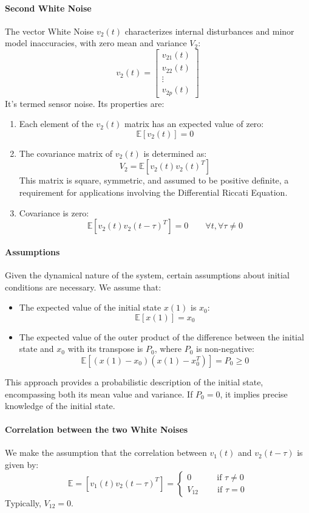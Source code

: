 \paragraph*{Second White Noise}
The vector White Noise $v_2(t)$ characterizes internal disturbances and minor model inaccuracies, with zero mean and variance $V_2$:
\[v_2(t)=\begin{bmatrix} v_{21}(t) \\ v_{22}(t) \\ \vdots \\ v_{2p}(t) \end{bmatrix}\]
It's termed sensor noise. 
Its properties are:
\begin{enumerate}
    \item Each element of the $v_2(t)$ matrix has an expected value of zero:
        \[\mathbb{E}\left[v_2(t)\right]=0\]
    \item The covariance matrix of $v_2(t)$ is determined as:
        \[V_2=\mathbb{E}\left[v_2(t)v_2(t)^T\right]\]
        This matrix is square, symmetric, and assumed to be positive definite, a requirement for applications involving the Differential Riccati Equation.
    \item Covariance is zero:
        \[\mathbb{E}\left[v_2(t)v_2(t-\tau)^T\right]=0\qquad \forall t, \forall\tau\neq 0\]
\end{enumerate}

\paragraph*{Assumptions}
Given the dynamical nature of the system, certain assumptions about initial conditions are necessary. 
We assume that:
\begin{itemize}
    \item The expected value of the initial state $x(1)$ is $x_0$: 
        \[\mathbb{E}\left[x(1)\right]=x_0\]
    \item The expected value of the outer product of the difference between the initial state and $x_0$ with its transpose is $P_0$, where $P_0$ is non-negative: 
        \[\mathbb{E}\left[\left(x(1)-x_0\right)\left(x(1)-x_0^T\right)\right]=P_0\geq 0\]
\end{itemize}
This approach provides a probabilistic description of the initial state, encompassing both its mean value and variance.
If $P_0=0$, it implies precise knowledge of the initial state.

\paragraph*{Correlation between the two White Noises}
We make the assumption that the correlation between $v_1(t)$ and $v_2(t-\tau)$ is given by:
\[\mathbb{E}=\left[v_1(t)v_2(t-\tau)^T\right]=\begin{cases}
    0 \qquad\quad\text{if }\tau\neq 0 \\
    V_{12} \qquad\:\text{if }\tau= 0
\end{cases}\]
Typically, $V_{12}=0$.

